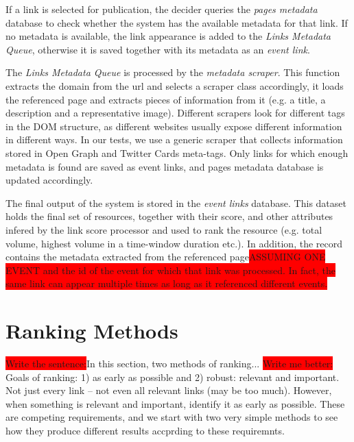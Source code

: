 \documentclass{sig-alternate}
\newcommand{\todo}[1]{\colorbox{red}{#1}}
\begin{document}
If a link is selected for publication, the decider queries the \emph{pages metadata} database to check whether the system has the available metadata for that link. If no metadata is available, the link appearance is added to the \emph{Links Metadata Queue}, otherwise it is saved together with its metadata as an \emph{event link}. 

The \emph{Links Metadata Queue} is processed by the \emph{metadata scraper}. This function extracts the domain from the url and selects a scraper class accordingly, it loads the referenced page and extracts pieces of information from it (e.g. a title, a description and a representative image). Different scrapers look for different tags in the DOM structure, as different websites usually expose different information in different ways. In our tests, we use a generic scraper that collects information stored in Open Graph and Twitter Cards meta-tags. Only links for which enough metadata is found are saved as event links, and pages metadata database is updated accordingly. %

The final output of the system is stored in the \emph{event links} database. This dataset holds the final set of resources, together with their score, and other attributes infered by the link score processor and used to rank the resource (e.g. total volume, highest volume in a time-window duration etc.). In addition, the record contains the metadata extracted from the referenced page\todo{ASSUMING ONE EVENT and the id of the event for which that link was processed. In fact, the same link can appear multiple times as long as it referenced different events.}

\section{Ranking Methods}
\label{sec:ranking_methods}
\todo{Write the sentence:}In this section, two methods of ranking...
\todo{Write me better:} Goals of ranking: 1) as early as possible and 2) robust: relevant and important. Not just every link -- not even all relevant links (may be too much). However, when something is relevant and important, identify it as early as possible. These are competing requirements, and we start with two very simple methods to see how they produce different results accprding to these requiremnts.
\end{document}
